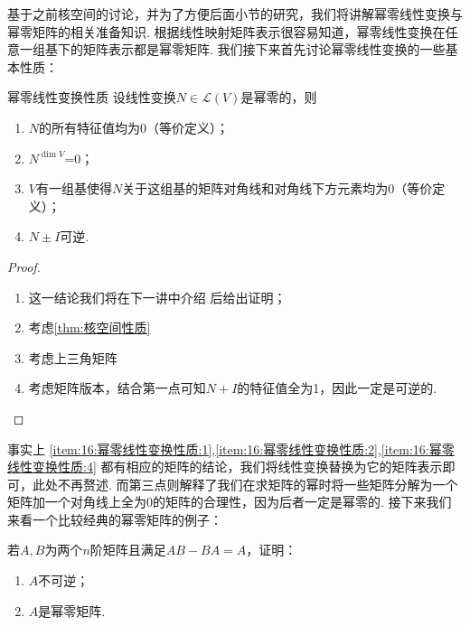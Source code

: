 基于之前核空间的讨论，并为了方便后面小节的研究，我们将讲解幂零线性变换与幂零矩阵的相关准备知识. 根据线性映射矩阵表示很容易知道，幂零线性变换在任意一组基下的矩阵表示都是幂零矩阵. 我们接下来首先讨论幂零线性变换的一些基本性质：
\begin{theorem}{}{幂零线性变换性质}
    设线性变换$N\in \mathcal{L}(V)$是幂零的，则
    \begin{enumerate}
        \item \label{item:16:幂零线性变换性质:1}
              $N$的所有特征值均为0（等价定义）；

        \item \label{item:16:幂零线性变换性质:2}
              $N^{\dim V}$=0；

        \item \label{item:16:幂零线性变换性质:3}
              $V$有一组基使得$N$关于这组基的矩阵对角线和对角线下方元素均为0（等价定义）；

        \item \label{item:16:幂零线性变换性质:4}
              $N\pm I$可逆.
    \end{enumerate}
\end{theorem}

\begin{proof}
    \begin{enumerate}
        \item 这一结论我们将在下一讲中介绍 后给出证明；

        \item 考虑\autoref{thm:核空间性质}

        \item 考虑上三角矩阵

        \item 考虑矩阵版本，结合第一点可知$N+I$的特征值全为1，因此一定是可逆的.
    \end{enumerate}
\end{proof}

事实上 \ref*{item:16:幂零线性变换性质:1},\ref*{item:16:幂零线性变换性质:2},\ref*{item:16:幂零线性变换性质:4} 都有相应的矩阵的结论，我们将线性变换替换为它的矩阵表示即可，此处不再赘述. 而第三点则解释了我们在求矩阵的幂时将一些矩阵分解为一个矩阵加一个对角线上全为0的矩阵的合理性，因为后者一定是幂零的. 接下来我们来看一个比较经典的幂零矩阵的例子：
\begin{example}{}{}
    若$A,B$为两个$n$阶矩阵且满足$AB-BA=A$，证明：
    \begin{enumerate}
        \item $A$不可逆；

        \item $A$是幂零矩阵.
    \end{enumerate}
\end{example}


